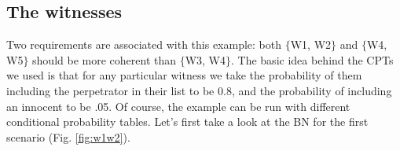 \documentclass[10pt,]{scrartcl}
\begin{document}
\begin{table}[H]
\centering
{}
\end{table}

\subsection{The witnesses}\label{the-witnesses-1}

Two requirements are associated with this example: both
\(\{\)\textsf{W1, W2}\(\}\) and \(\{\)\textsf{W4, W5}\(\}\) should be
more coherent than \(\{\)\textsf{W3, W4}\(\}\). The basic idea behind
the CPTs we used is that for any particular witness we take the
probability of them including the perpetrator in their list to be 0.8,
and the probability of including an innocent to be .05. Of course, the
example can be run with different conditional probability tables. Let's
first take a look at the BN for the first scenario (Fig.
\ref{fig:w1w2}).
\end{document}
